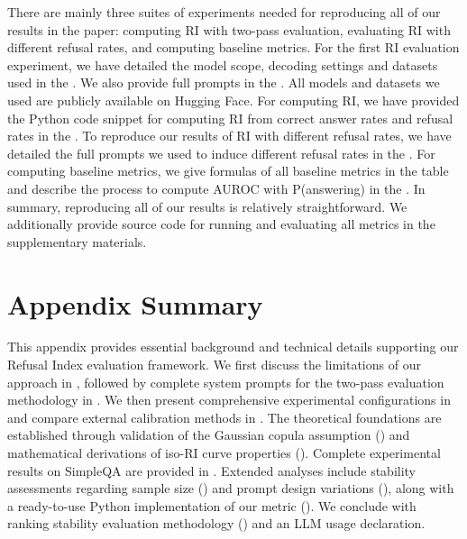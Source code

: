 \documentclass{article} %
\theoremstyle{definition}
\begin{document}
There are mainly three suites of experiments needed for reproducing all of our results in the paper: computing RI with two-pass evaluation, evaluating RI with different refusal rates, and computing baseline metrics.
For the first RI evaluation experiment, we have detailed the model scope, decoding settings and datasets used in the . We also provide full prompts in the . 
All models and datasets we used are publicly available on Hugging Face. 
For computing RI, we have provided the Python code snippet for computing RI from correct answer rates and refusal rates in the .
To reproduce our results of RI with different refusal rates, we have detailed the full prompts we used to induce different refusal rates in the . 
For computing baseline metrics, we give formulas of all baseline metrics in the table and describe the process to compute AUROC with P(answering) in the .
In summary, reproducing all of our results is relatively straightforward. 
We additionally provide source code for running and evaluating all metrics in the supplementary materials.




\newpage
\appendix

\section*{Appendix Summary}
This appendix provides essential background and technical details supporting our Refusal Index evaluation framework. We first discuss the limitations of our approach in , followed by complete system prompts for the two-pass evaluation methodology in . We then present comprehensive experimental configurations in  and compare external calibration methods in . The theoretical foundations are established through validation of the Gaussian copula assumption () and mathematical derivations of iso-RI curve properties (). Complete experimental results on SimpleQA are provided in . Extended analyses include stability assessments regarding sample size () and prompt design variations (), along with a ready-to-use Python implementation of our metric (). We conclude with ranking stability evaluation methodology () and an LLM usage declaration.
\end{document}
